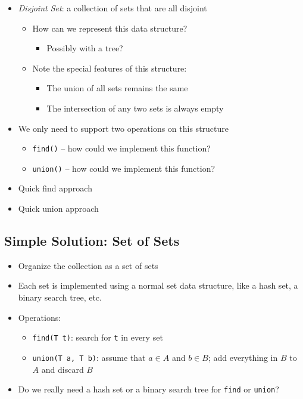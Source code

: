 \documentclass[
  10pt,
  english,
  letterpaper,
,tablecaptionabove
]{scrartcl}
\newcommand{\passthrough}[1]{#1}
\providecommand{\tightlist}{%
  \setlength{\itemsep}{0pt}\setlength{\parskip}{0pt}}
\begin{document}
\begin{itemize}
\tightlist
\item
  \emph{Disjoint Set}: a collection of sets that are all disjoint

  \begin{itemize}
  \tightlist
  \item
    How can we represent this data structure?

    \begin{itemize}
    \tightlist
    \item
      Possibly with a tree?
    \end{itemize}
  \item
    Note the special features of this structure:

    \begin{itemize}
    \tightlist
    \item
      The union of all sets remains the same
    \item
      The intersection of any two sets is always empty
    \end{itemize}
  \end{itemize}
\item
  We only need to support two operations on this structure

  \begin{itemize}
  \tightlist
  \item
    \passthrough{\lstinline!find()!} -- how could we implement this
    function?
  \item
    \passthrough{\lstinline!union()!} -- how could we implement this
    function?
  \end{itemize}
\item
  Quick find approach
\item
  Quick union approach
\end{itemize}

\hypertarget{simple-solution-set-of-sets}{%
\subsection{Simple Solution: Set of
Sets}\label{simple-solution-set-of-sets}}

\begin{itemize}
\tightlist
\item
  Organize the collection as a set of sets
\item
  Each set is implemented using a normal set data structure, like a hash
  set, a binary search tree, etc.
\item
  Operations:

  \begin{itemize}
  \tightlist
  \item
    \passthrough{\lstinline!find(T t)!}: search for
    \passthrough{\lstinline!t!} in every set
  \item
    \passthrough{\lstinline!union(T a, T b)!}: assume that \(a\in A\)
    and \(b\in B\); add everything in \(B\) to \(A\) and discard \(B\)
  \end{itemize}
\item
  Do we really need a hash set or a binary search tree for
  \passthrough{\lstinline!find!} or \passthrough{\lstinline!union!}?
\end{itemize}
\end{document}
